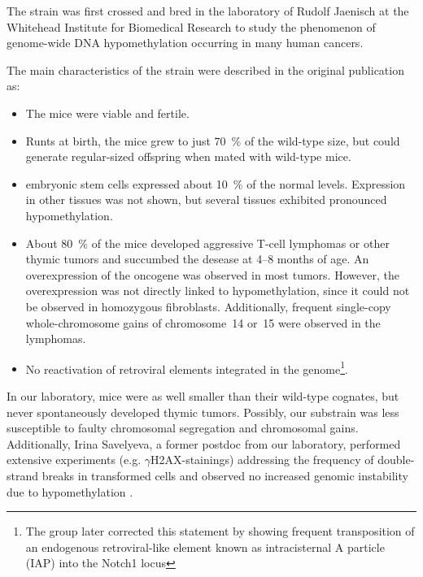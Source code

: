 The \dnmtchip strain was first crossed and bred in the laboratory of Rudolf Jaenisch\cite{Gaudet2003} at the Whitehead Institute for Biomedical Research to study the phenomenon of genome-wide DNA hypomethylation occurring in many human cancers\cite{Ehrlich2009,Timp2014}. 

The main characteristics of the strain were described in the original publication\cite{Gaudet2003} as:
\begin{itemize}
	\item The mice were viable and fertile.
	\item Runts at birth, the mice grew to just \SI{70}{\percent} of the wild-type size, but could generate regular-sized offspring when mated with wild-type mice.
	\item \dnmtchip embryonic stem cells expressed about \SI{10}{\percent} of the normal  levels. Expression in other tissues was not shown, but several tissues exhibited pronounced hypomethylation. 
	\item About \SI{80}{\percent} of the mice developed aggressive T-cell lymphomas or other thymic tumors and succumbed the desease at \numrange{4}{8} months of age. An overexpression of  the  oncogene was observed in most tumors. However, the overexpression was not directly linked to hypomethylation, since it could not be observed in homozygous \dnmtcallele fibroblasts. Additionally, frequent single-copy whole-chromosome gains of chromosome~\num{14} or~\num{15} were observed in the lymphomas. 
	\item No reactivation of retroviral elements integrated in the genome\footnote{The group later corrected this statement by showing frequent transposition of an endogenous retroviral-like element known as intracisternal A particle (IAP) into the Notch1 locus\cite{Howard2008}}.       
\end{itemize} 

In our laboratory, \dnmtchip mice were as well smaller than their wild-type cognates, but never spontaneously developed thymic tumors. Possibly, our substrain was less susceptible to faulty chromosomal segregation and chromosomal gains. Additionally, Irina Savelyeva, a former postdoc from our laboratory, performed extensive experiments (e.g. \ensuremath{\gamma}H2AX-stainings) addressing the frequency of double-strand breaks in \mllafnine transformed \dnmtchip cells and observed no increased genomic instability due to hypomethylation \dns. 

